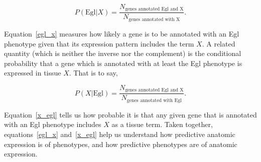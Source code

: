 \documentclass[10pt,letterpaper,twocolumn]{article}
\begin{document}
\begin{equation}
  P(\text{Egl}|X) = \frac{N_\text{genes annotated Egl and X}}
                         {N_\text{genes annotated with X}}.
\label{egl_x}
\end{equation}

Equation~\ref{egl_x} measures how likely a gene is to be annotated with an Egl
phenotype given that its expression pattern includes the term $X$. A related
quantity (which is neither the inverse nor the complement) is the conditional
probability that a gene which is annotated with at least the Egl phenotype is
expressed in tissue $X$. That is to say,

\begin{equation}
  P(X|\text{Egl}) = \frac{N_\text{genes annotated Egl and X}}
                         {N_\text{genes annotated with Egl}}.
  \label{x_egl}
\end{equation}

Equation~\ref{x_egl} tells us how probable it is that any given gene that is
annotated with an Egl phenotype includes $X$ as a tissue term. Taken together,
equations~\ref{egl_x} and~\ref{x_egl} help us understand how predictive
anatomic expression is of phenotypes, and how predictive phenotypes are of
anatomic expression.
\end{document}
